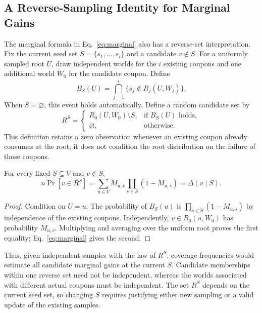 \documentclass[sigconf]{acmart}
\begin{document}
\subsection{A Reverse-Sampling Identity for Marginal Gains}
\label{sec:marginal-reverse}

The marginal formula in Eq.~\eqref{eq:marginal} also has a reverse-set
interpretation. Fix the current seed set $S=\{s_1,\ldots,s_i\}$ and
a candidate $v\notin S$. For a uniformly sampled root $U$, draw
independent worlds for the $i$ existing coupons and one additional
world $W_0$ for the candidate coupon. Define
\[
  B_S(U)=\bigcap_{j=1}^{i}\{s_j\notin R_j(U,W_j)\}.
\]
When $S=\varnothing$, this event holds automatically. Define a random
candidate set by
\begin{equation}
\label{eq:marginal-reverse-set}
  R^S=
  \begin{cases}
    R_0(U,W_0)\setminus S,&\text{if }B_S(U)\text{ holds},\\
    \varnothing,&\text{otherwise.}
  \end{cases}
\end{equation}
This definition retains a zero observation whenever an existing
coupon already consumes at the root; it does not condition the root
distribution on the failure of those coupons.

\begin{lemma}
\label{lem:marginal-coverage}
For every fixed $S\subseteq V$ and $v\notin S$,
\begin{equation}
\label{eq:marginal-unbiased}
  n\Pr[v\in R^S]
    =\sum_{u\in V}M_{u,v}\prod_{s\in S}(1-M_{u,s})
    =\Delta(v\mid S).
\end{equation}
\end{lemma}

\begin{proof}
Condition on $U=u$. The probability of $B_S(u)$ is
$\prod_{s\in S}(1-M_{u,s})$ by independence of the existing coupons.
Independently, $v\in R_0(u,W_0)$ has probability $M_{u,v}$.
Multiplying and averaging over the uniform root proves the first
equality; Eq.~\eqref{eq:marginal} gives the second.
\end{proof}

Thus, given independent samples with the law of $R^S$, coverage
frequencies would estimate all candidate marginal gains at the
current $S$. Candidate memberships within one reverse set need not
be independent, whereas the worlds associated with different actual
coupons must be independent. The set $R^S$ depends on the current
seed set, so changing $S$ requires justifying either new sampling or
a valid update of the existing samples.
\end{document}
